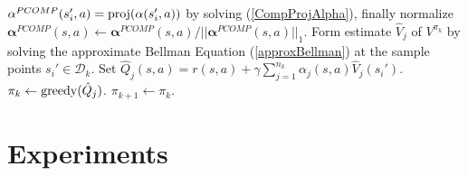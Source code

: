 \documentclass[letterpaper]{article}
\newcommand{\cD}{{\mathcal D}}
\newcommand{\balpha}{{\bm \alpha}}
\newcommand{\greedy}{\operatornamewithlimits{greedy}}
\begin{document}
\begin{algorithm}[h]
\begin{algorithmic}
	  $\alpha^{PCOMP}(s_i',a) = {\rm proj}(\alpha(s_i',a))$ by solving (\ref{CompProjAlpha}), finally normalize $\balpha^{PCOMP}(s,a) \leftarrow \balpha^{PCOMP}(s,a)/||\balpha^{PCOMP}(s,a)||_1$.
    Form estimate $\hat V_j$ of $V^{\pi_k}$ by solving the approximate Bellman Equation (\ref{approxBellman}) at the sample points $s_i'\in\cD_k$. Set $\hat Q_j(s,a) = r(s,a) + \gamma \sum_{j=1}^{n_k} \alpha_j(s,a) \hat V_j(s_i')$.
	  $\pi_{k} \leftarrow \greedy(\hat Q_j)$. 
   \ENDFOR
	 \STATE $\pi_{k+1} \leftarrow \pi_{k} $.
   \ENDFOR
\end{algorithmic}
\end{algorithm}

\section{Experiments}
\end{document}
